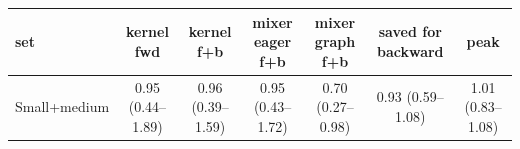 \begin{tabular}{l c c c c c c }
\toprule
set & kernel fwd & kernel f+b & mixer eager f+b & mixer graph f+b & saved for backward & peak \\
\midrule
Small+medium & 0.95 (0.44--1.89) & 0.96 (0.39--1.59) & 0.95 (0.43--1.72) & 0.70 (0.27--0.98) & 0.93 (0.59--1.08) & 1.01 (0.83--1.08) \\
\bottomrule
\end{tabular}
